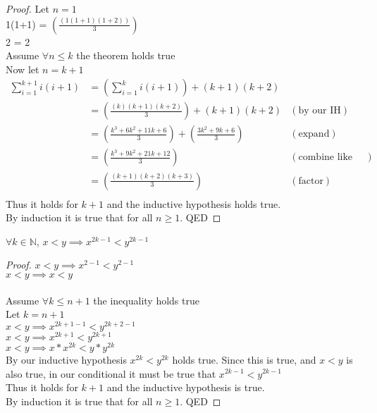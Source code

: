 \documentclass[12pt]{article}
\newcommand{\N}{\mathbb{N}}
\newenvironment{theorem}[2][Theorem]{\begin{trivlist}
\item[\hskip \labelsep {\bfseries #1}\hskip \labelsep {\bfseries #2.}]}{\end{trivlist}}
\begin{document}
\begin{proof}
Let $n=1$ \\
1(1+1) = $\left(\frac{(1(1+1)(1+2))}{3}\right)$ \\
2 = 2\\
Assume $\forall n \leq k$ the theorem holds true \\
Now let $n=k+1$
\begin{align*}
\sum_{i=1}^{k+1}i(i+1) & = \left(\sum_{i=1}^{k}i(i+1)\right)+(k+1)(k+2) \\
& = \left(\frac{(k)(k+1)(k+2)}{3}\right) + (k+1)(k+2) & (\text{by our IH})\\
& = \left(\frac{k^3+6k^2+11k+6}{3}\right)+\left(\frac{3k^2+9k+6}{3}\right)  & (\text{expand})\\
& = \left(\frac{k^3+9k^2+21k+12}{3}\right) & (\text{combine like terms})\\
& = \left(\frac{(k+1)(k+2)(k+3)}{3}\right) & (\text{factor})\\
\end{align*}
Thus it holds for $k+1$ and the inductive hypothesis holds true.\\
By induction it is true that for all $n \geq 1$. QED
\end{proof} 
\begin{theorem}{3.19}
$\forall k\in \N$, $x<y \implies x^{2k-1} < y^{2k-1}$\\
\end{theorem}
\begin{proof}
$x<y \implies x^{2-1} < y^{2-1}$\\
$x<y \implies x<y$\\ \\
Assume $\forall k \leq n+1$ the inequality holds true\\
Let $k=n+1$\\
$x<y \implies x^{2k+1-1} < y^{2k+2-1}$\\
$x<y \implies x^{2k+1} < y^{2k+1}$\\
$x<y \implies x*x^{2k} < y*y^{2k}$\\
By our inductive hypothesis $x^{2k} < y^{2k}$ holds true.
Since this is true, and $x<y$ is also true, in our conditional it must be true that $x^{2k-1} < y^{2k-1}$\\
Thus it holds for $k+1$ and the inductive hypothesis is true.\\
By induction it is true that for all $n \geq 1$. QED
\end{proof}
\end{document}
